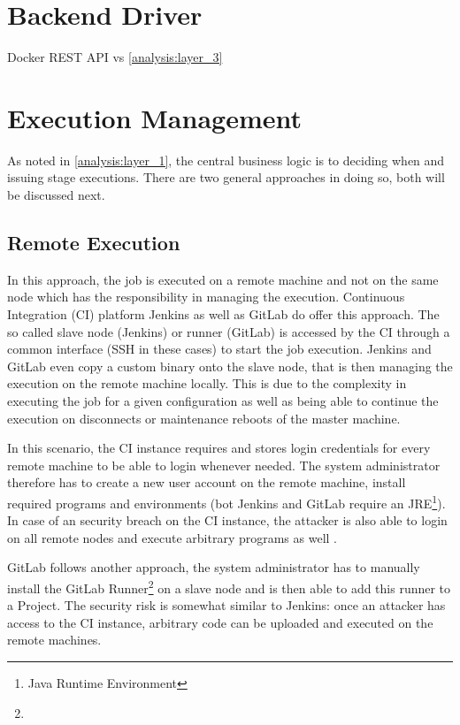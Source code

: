 \section{Backend Driver}

Docker REST API vs 
 \autoref{analysis:layer_3}


\section{Execution Management}

As noted in \autoref{analysis:layer_1}, the central business logic is to deciding when and issuing stage executions.
There are two general approaches in doing so, both will be discussed next.

\subsection{Remote Execution}

In this approach, the job is executed on a remote machine and not on the same node which has the responsibility in managing the execution.
Continuous Integration (CI) platform Jenkins\cite{jenkins:main} as well as GitLab\cite{gitlab:main} do offer this approach.
The so called slave node (Jenkins) or runner (GitLab) is accessed by the CI through a common interface (SSH in these cases) to start the job execution.
Jenkins and GitLab even copy a custom binary onto the slave node, that is then managing the execution on the remote machine locally.
This is due to the complexity in executing the job for a given configuration as well as being able to continue the execution on disconnects or maintenance reboots of the master machine.

In this scenario, the CI instance requires and stores login credentials for every remote machine to be able to login whenever needed.
The system administrator therefore has to create a new user account on the remote machine, install required programs and environments (bot Jenkins and GitLab require an JRE\footnote{Java Runtime Environment}).
In case of an security breach on the CI instance, the attacker is also able to login on all remote nodes and execute arbitrary programs as well .


GitLab follows another approach, the system administrator has to manually install the GitLab Runner\footnote{} on a slave node and is then able to add this runner to a Project.
The security risk is somewhat similar to Jenkins: once an attacker has access to the CI instance, arbitrary code can be uploaded and executed on the remote machines. 

